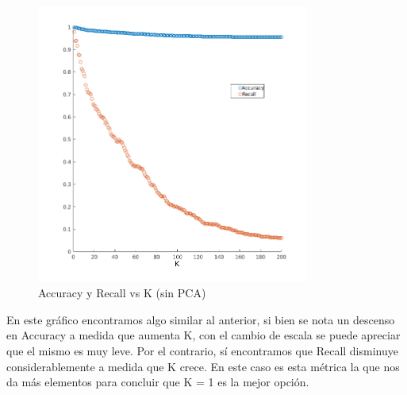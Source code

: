 \begin{figure}[H]
	\centering
	\includegraphics[width=0.8\textwidth]{img/Acc_recall_k_knn.png}
	\caption{Accuracy y Recall vs K (sin PCA)}
	\label{fig: Accuracy y Recall vs K (sin PCA)}
\end{figure}

En este gráfico encontramos algo similar al anterior, si bien se nota un descenso en Accuracy a medida que aumenta K, con el cambio de escala se puede apreciar que el mismo es muy leve.
Por el contrario, sí encontramos que Recall disminuye considerablemente a medida que K crece. En este caso es esta métrica la que nos da más elementos para concluir que K = 1 es la mejor opción.





%
%

